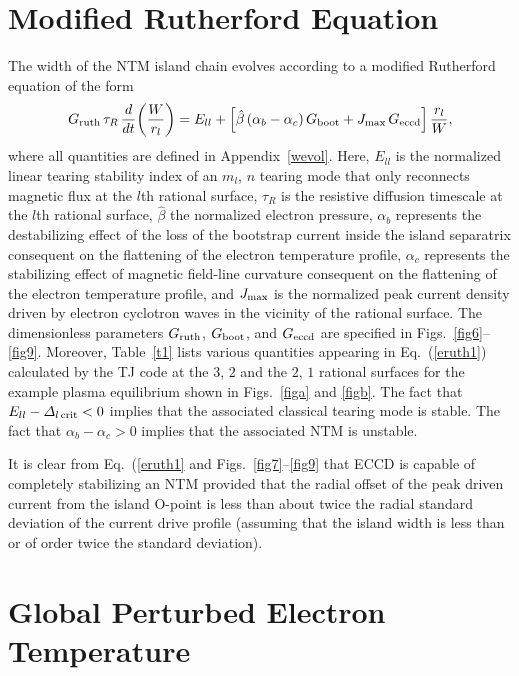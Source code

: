 \documentclass{iopjournal}
\begin{document}
{\section{Modified Rutherford Equation}
The width of the NTM island chain evolves according to a modified Rutherford equation of the form
\begin{equation}\label{eruth1}
G_{\rm ruth}\,\tau_R\,\frac{d}{dt}\!\left(\frac{W}{r_l}\right) = E_{ll} +\left[\hat{\beta}\,(\alpha_b-\alpha_c)\,G_{\rm boot} + J_{\rm max}\,G_{\rm eccd}\right]
\frac{r_l}{W},
\end{equation}
where all quantities are defined in Appendix~\ref{wevol}. 
Here, $E_{ll}$ is the  normalized linear tearing stability index of an $m_l$, $n$ tearing mode
 that only reconnects magnetic flux at the $l$th rational surface, $\tau_R$ is the resistive diffusion timescale at the $l$th rational surface, $\hat{\beta}$ the normalized electron pressure, $\alpha_b$ represents  the
 destabilizing effect of the loss of the bootstrap current inside the island separatrix consequent on the flattening of the electron temperature profile, 
 $\alpha_c$ represents  the stabilizing effect of  magnetic field-line curvature  consequent on the flattening of the electron temperature profile, 
 and $J_{\rm max}$ is the normalized peak current density driven by electron cyclotron waves in the vicinity of the rational surface. The
 dimensionless parameters $G_{\rm ruth}$, $G_{\rm boot}$, and $G_{\rm eccd}$ are specified in Figs.~\ref{fig6}--\ref{fig9}. Moreover,
 Table~\ref{t1} lists various quantities appearing in Eq.~(\ref{eruth1})  calculated by the TJ code at the $3$, $2$ and the $2$, $1$ rational surfaces for the example plasma equilibrium shown in Figs.~\ref{figa} and \ref{figb}. The fact that $E_{ll}-{\mit\Delta}_{l\,{\rm crit}}<0$ implies that the associated classical tearing mode is stable. The fact that $\alpha_b-\alpha_c>0$ implies that the associated NTM is
 unstable. 
 
 It is clear from Eq.~(\ref{eruth1} and Figs.~\ref{fig7}--\ref{fig9} that ECCD is capable of completely stabilizing an NTM provided that the radial offset of the peak driven current from the island
O-point is less than about twice the radial standard deviation of the current drive profile (assuming that the island width is less than or of order twice the
standard deviation). 

\section{Global Perturbed Electron Temperature}\label{s5}
}
\end{document}
